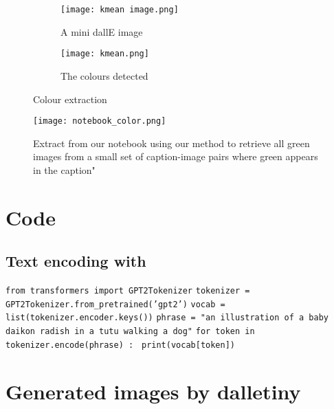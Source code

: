 \documentclass{article}
\begin{document}
\begin{appendix}
\begin{figure}[H]
\begin{subfigure}{.5\textwidth}
  \centering
  \texttt{[image: kmean image.png]}
  \caption{A mini dallE image}
  \label{fig:sfig_kmean_image}
\end{subfigure}%
\begin{subfigure}{.5\textwidth}
  \centering
  \texttt{[image: kmean.png]}
  \caption{The colours detected}
  \label{fig:sfig_kmean}
\end{subfigure}
\caption{Colour extraction}
\label{fig:kmean}
\end{figure}

\begin{figure}[H]
    \centering
    \texttt{[image: notebook\_color.png]}
    \caption{Extract from our notebook using our method to retrieve all green images from a small set of caption-image pairs where green appears in the caption"}
    \label{fig:nb_color}
\end{figure}



\section{Code}

\subsection{Text encoding with } \label{textencoding}

\texttt{from transformers import GPT2Tokenizer} \newline
\texttt{tokenizer = GPT2Tokenizer.from_pretrained('gpt2')} \newline
\texttt{vocab     = list(tokenizer.encoder.keys())} \newline 
\texttt{phrase    = "an illustration of a baby daikon radish in a tutu walking a dog"} \newline 
\texttt{for token in tokenizer.encode(phrase) :} \newline 
\texttt{    print(vocab[token])} \newline

\section{Generated images by \gls{dalletiny}}\label{section:imagedalletiny}


\end{appendix}
\end{document}
